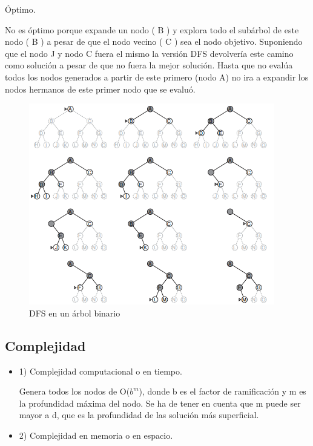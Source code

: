\documentclass[conference]{IEEEtran}
\begin{document}
{{\begin{itemize}
{\item \'Optimo. 


No es \'optimo porque expande un nodo ( B ) y explora todo el sub\'arbol de este nodo ( B ) a pesar de que el nodo vecino ( C ) sea el nodo objetivo. Suponiendo que el nodo J y nodo C fuera el mismo la versi\'on DFS devolvería este camino como soluci\'on a pesar de que no fuera la mejor soluci\'on. Hasta que no eval\'ua todos los nodos generados a partir de este primero (nodo A) no ira a expandir los nodos hermanos de este primer nodo que se evalu\'o. 
}


\end{itemize}
}

\begin{figure}[H]
\centerline{\includegraphics[scale=0.4]{IMAGENES/Tree_search_DFS.png}}
\caption{DFS en un \'arbol binario}
\label{fig}
\end{figure}

\subsection{Complejidad}
{\setlength{\parskip}{1em}
\begin{itemize}

\item 1)	Complejidad computacional o en tiempo. 

Genera todos los nodos de O($b^{m}$), donde b es el factor de ramificaci\'on y m es la profundidad m\'axima del nodo. Se ha de tener en cuenta que m puede ser mayor a d, que es la profundidad de las soluci\'on m\'as superficial.

\item 2)	Complejidad en memoria o en espacio. 


\end{itemize}}}
\end{document}
